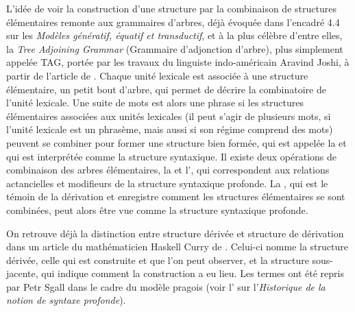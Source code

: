 {L’idée de voir la construction d’une structure par la combinaison de structures élémentaires remonte aux grammaires d’arbres, déjà évoquée dans l’encadré 4.4 sur les \textit{Modèles génératif, équatif et transductif}, et à la plus célèbre d’entre elles, la \textit{Tree Adjoining Grammar} (Grammaire d’adjonction d’arbre), plus simplement appelée TAG, portée par les travaux du linguiste indo-américain Aravind Joshi, à partir de l’article de \citeyear{joshi1975tree}. Chaque unité lexicale est associée à une structure élémentaire, un petit bout d’arbre, qui permet de décrire la combinatoire de l’unité lexicale. Une suite de mots est alors une phrase si les structures élémentaires associées aux unités lexicales (il peut s’agir de plusieurs mots, si l’unité lexicale est un phrasème, mais aussi si son régime comprend des mots) peuvent se combiner pour former une structure bien formée, qui est appelée la  et qui est interprétée comme la structure syntaxique.  Il existe deux opérations de combinaison des arbres élémentaires, la  et l’, qui correspondent aux relations actancielles et modifieurs de la structure syntaxique profonde. La , qui est le témoin de la dérivation et enregistre comment les structures élémentaires se sont combinées, peut alors être vue comme la structure syntaxique profonde. 

On retrouve déjà la distinction entre structure dérivée et structure de dérivation dans un article du mathématicien Haskell Curry de \citeyear{curry1961some}. Celui-ci nomme  la structure dérivée, celle qui est construite et que l’on peut observer, et  la structure sous-jacente, qui indique comment la construction a eu lieu. Les termes ont été repris par Petr Sgall dans le cadre du modèle pragois (voir l’ sur l’\textit{Historique de la notion de syntaxe profonde}).

}
